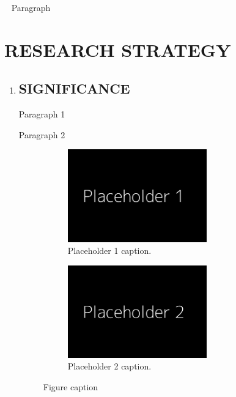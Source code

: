 \documentclass[11pt]{article}
\newcommand{\myparagraph}[1]{\vspace{0.5ex}\noindent{\bf #1} ~}
\begin{document}
\myparagraph{Aim 3. } 
Paragraph

\clearpage
\section*{RESEARCH STRATEGY} 

\begin{enumerate}[wide, labelindent=0pt]

\item \subsection*{SIGNIFICANCE} 
Paragraph 1

Paragraph 2

\begin{figure}[h]
    \vspace{-2mm}
    \begin{subfigure}[b]{0.45\textwidth}
    \includegraphics[height=4cm]{images/Placeholder1.png}
        \caption{Placeholder 1 caption.}
    \label{fig:placeholder_1_double}
    \end{subfigure}
    \hspace{0.06\textwidth}
    \begin{subfigure}[t]{0.45\textwidth}
        \includegraphics[height=4cm]{images/Placeholder2.png}
        \caption{Placeholder 2 caption.}
        \label{fig:placeholder_2_double}
    \end{subfigure}
    \caption{Figure caption}
    \label{fig:placeholder_1_2_double}
\end{figure}



\end{enumerate}
\end{document}
